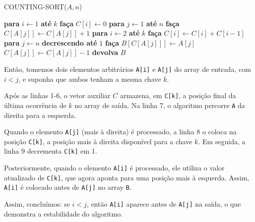 \documentclass[a4paper,12pt]{article}
\begin{document}
\begin{algorithm}
	\caption{COUNTING-SORT($A, n$)}
	\begin{algorithmic}[1]
		\STATE \textbf{para} $i \gets 1$ \textbf{até} $k$ \textbf{faça}
		\STATE \hspace{0.5cm} $C[i] \gets 0$
		\STATE \textbf{para} $j \gets 1$ \textbf{até} $n$ \textbf{faça}
		\STATE \hspace{0.5cm} $C[A[j]] \gets C[A[j]] + 1$
		\STATE \textbf{para} $i \gets 2$ \textbf{até} $k$ \textbf{faça}
		\STATE \hspace{0.5cm} $C[i] \gets C[i] + C[i-1]$
		\STATE \textbf{para} $j \gets n$ \textbf{decrescendo até} $1$ \textbf{faça}
		\STATE \hspace{0.5cm} $B[C[A[j]]] \gets A[j]$
		\STATE \hspace{0.5cm} $C[A[j]] \gets C[A[j]] - 1$
		\STATE \textbf{devolva} $B$
	\end{algorithmic}
\end{algorithm}

Então, tomemos dois elementos arbitrários \texttt{A[i]} e \texttt{A[j]} do array de entrada, com $i < j$, e suponha que ambos tenham a mesma chave $k$.

Após as linhas 1-6, o vetor auxiliar $C$ armazena, em \texttt{C[k]},  a posição final da última ocorrência de $k$ no array de saída. Na linha 7, o algoritmo percorre \texttt{A} da direita para a esquerda.

Quando o elemento \texttt{A[j]} (mais à direita) é processado, a linha 8 o coloca na posição \texttt{C[k]}, a posição mais à direita disponível para a chave $k$. Em seguida, a linha 9 decrementa \texttt{C[k]} em 1.

Posteriormente, quando o elemento \texttt{A[i]} é processado, ele utiliza o valor atualizado de \texttt{C[k]}, que agora aponta para uma posição mais à esquerda. Assim, \texttt{A[i]} é colocado antes de \texttt{A[j]} no array \texttt{B}.

Assim, concluímos: se $i < j$, então \texttt{A[i]} aparece antes de \texttt{A[j]} na saída, o que demonstra a estabilidade do algoritmo.


\end{document}

